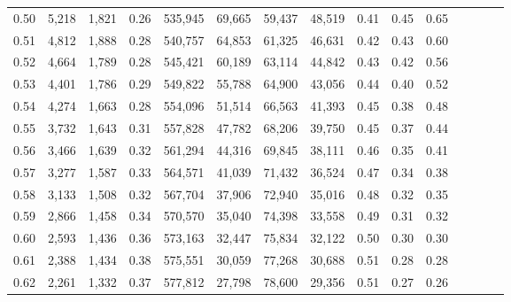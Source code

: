 \begin{tabular}{rrrcrrrrrrrrrrr}
0.50 &   5,218 &  1,821 &                                       0.26 &  535,945 &   69,665 &   59,437 &   48,519 &  0.41 &  0.45 &                         0.65 \\
0.51 &   4,812 &  1,888 &                                       0.28 &  540,757 &   64,853 &   61,325 &   46,631 &  0.42 &  0.43 &                         0.60 \\
0.52 &   4,664 &  1,789 &                                       0.28 &  545,421 &   60,189 &   63,114 &   44,842 &  0.43 &  0.42 &                         0.56 \\
0.53 &   4,401 &  1,786 &                                       0.29 &  549,822 &   55,788 &   64,900 &   43,056 &  0.44 &  0.40 &                         0.52 \\
0.54 &   4,274 &  1,663 &                                       0.28 &  554,096 &   51,514 &   66,563 &   41,393 &  0.45 &  0.38 &                         0.48 \\
0.55 &   3,732 &  1,643 &                                       0.31 &  557,828 &   47,782 &   68,206 &   39,750 &  0.45 &  0.37 &                         0.44 \\
0.56 &   3,466 &  1,639 &                                       0.32 &  561,294 &   44,316 &   69,845 &   38,111 &  0.46 &  0.35 &                         0.41 \\
0.57 &   3,277 &  1,587 &                                       0.33 &  564,571 &   41,039 &   71,432 &   36,524 &  0.47 &  0.34 &                         0.38 \\
0.58 &   3,133 &  1,508 &                                       0.32 &  567,704 &   37,906 &   72,940 &   35,016 &  0.48 &  0.32 &                         0.35 \\
0.59 &   2,866 &  1,458 &                                       0.34 &  570,570 &   35,040 &   74,398 &   33,558 &  0.49 &  0.31 &                         0.32 \\
0.60 &   2,593 &  1,436 &                                       0.36 &  573,163 &   32,447 &   75,834 &   32,122 &  0.50 &  0.30 &                         0.30 \\
0.61 &   2,388 &  1,434 &                                       0.38 &  575,551 &   30,059 &   77,268 &   30,688 &  0.51 &  0.28 &                         0.28 \\
0.62 &   2,261 &  1,332 &                                       0.37 &  577,812 &   27,798 &   78,600 &   29,356 &  0.51 &  0.27 &                         0.26 \\

\end{tabular}
